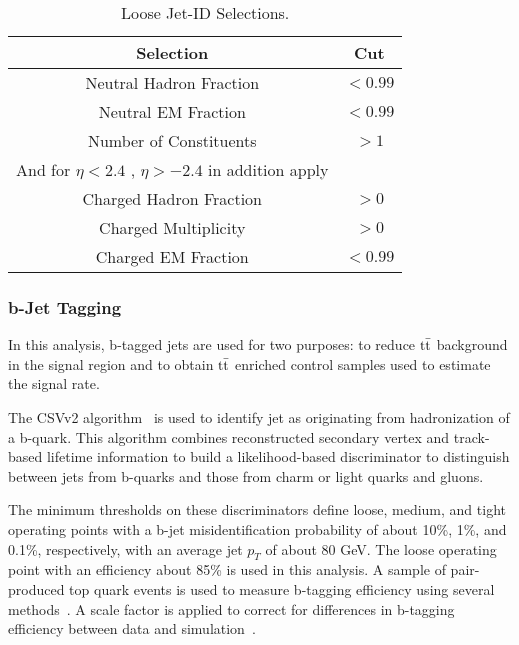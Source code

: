 \begin{table}[ht]
\here
\begin{center}
 \caption{Loose Jet-ID Selections.\label{tab:jetId}}
 \begin{tabular}{|cc|}
 \hline\hline
       Selection                        & Cut        \\[0.5ex] \hline
       Neutral Hadron Fraction          & $<0.99$      \\
       Neutral EM Fraction              & $<0.99$      \\
       Number of Constituents           & $> 1$        \\
       And for $\eta < 2.4$ , $\eta > -2.4$ in addition apply &\\
       Charged Hadron Fraction 	        & $> 0$   \\
       Charged Multiplicity             & $> 0$   \\
       Charged EM Fraction              & $<0.99$ \\
 \hline
 \hline
 \end{tabular}
\end{center}
\end{table}

\subsubsection{b-Jet Tagging}

In this analysis, b-tagged jets are used for two purposes: to reduce $\rm{t\bar{t}}$ background in the signal region and to obtain $\rm{t\bar{t}}$ enriched 
control samples used to estimate the signal rate.

The CSVv2 algorithm~\cite{Chatrchyan:2012jua} is used to identify jet as originating from hadronization of a b-quark. This algorithm combines 
reconstructed secondary vertex and track-based lifetime information to build a likelihood-based discriminator to distinguish between jets from b-quarks and those 
from charm or light quarks and gluons.

The minimum thresholds on these discriminators define loose, medium, and tight operating points with a b-jet misidentification probability of about 10\%, 1\%, and 
0.1\%, respectively, with an average jet $p_T$ of about 80 GeV. The loose operating point with an efficiency about 85\% is used in this analysis.
A sample of pair-produced top quark events is used to measure b-tagging efficiency using several methods~\cite{CMS-PAS-BTV-13-001}. A scale factor is 
applied to correct for differences in b-tagging efficiency between data and simulation~\cite{bTagging}.
